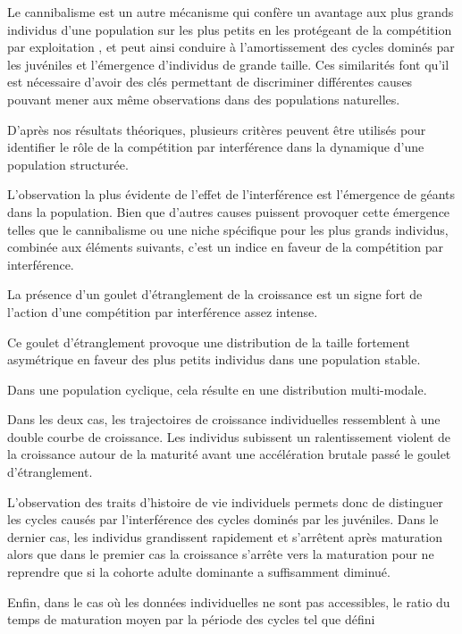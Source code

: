 Le cannibalisme est un autre mécanisme qui confère un avantage aux
plus grands individus d'une population sur les plus petits en les protégeant de la
compétition par exploitation \autocites{claessen2000a,claessen2002a}, et peut
ainsi conduire à l'amortissement des cycles dominés par les juvéniles et
l'émergence d'individus de grande taille. Ces similarités font qu'il est
nécessaire d'avoir des clés permettant de discriminer différentes causes pouvant
mener aux même observations dans des populations naturelles. 

D'après nos résultats théoriques, plusieurs critères peuvent être utilisés pour
identifier le rôle de la compétition par interférence dans la dynamique d'une
population structurée.
\begin{enumerate*}[label=(\roman*)] \item L'observation la plus évidente de
l'effet de l'interférence est l'émergence de géants dans la population. Bien que
d'autres causes puissent provoquer cette émergence telles que le cannibalisme ou
une niche spécifique pour les plus grands individus, combinée aux éléments
suivants, c'est un indice en faveur de la compétition par interférence.
\item La présence d'un goulet d'étranglement de la croissance est un signe fort
de l'action d'une compétition par interférence assez intense.
\item Ce goulet d'étranglement provoque une distribution de la taille fortement
asymétrique en faveur des plus petits individus dans une population stable.
\item Dans une population cyclique, cela résulte en une distribution
multi-modale.
\item Dans les deux cas, les trajectoires de croissance individuelles
ressemblent à une double courbe de croissance. Les individus subissent un
ralentissement violent de la croissance autour de la maturité avant une
accélération brutale passé le goulet d'étranglement.
\item L'observation des traits d'histoire de vie individuels permets donc de
distinguer les cycles causés par l'interférence des cycles dominés par les
juvéniles. Dans le dernier cas, les individus grandissent rapidement et
s'arrêtent après maturation alors que dans le premier cas la croissance s'arrête
vers la maturation pour ne reprendre que si la cohorte adulte dominante a
suffisamment diminué.
\item Enfin, dans le cas où les données individuelles ne sont pas accessibles,
le ratio du temps de maturation moyen par la période des cycles tel que défini

\end{enumerate*}
